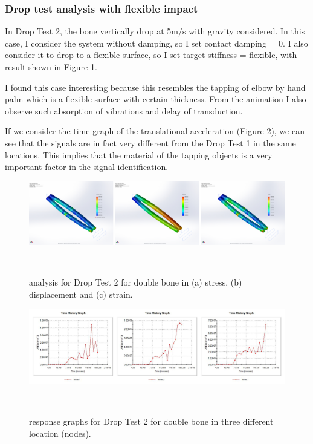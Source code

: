 \documentclass{sigchi}
\begin{document}
\subsubsection{Drop test analysis with flexible impact}

In Drop Test 2, the bone vertically drop at 5m/s with gravity considered. In this case, I consider the system without damping, so I set contact damping = 0. I also consider it to drop to a flexible surface, so I set target stiffness = flexible, with result shown in Figure \ref{fig:db_dt2_ana}. 

I found this case interesting because this resembles the tapping of elbow by hand palm which is a flexible surface with certain thickness. From the animation I also observe such absorption of vibrations and delay of transduction.

If we consider the time graph of the translational acceleration (Figure \ref{fig:db_dt2_res}), we can see that the signals are in fact very different from the Drop Test 1 in the same locations. This implies that the material of the tapping objects is a very important factor in the signal identification.

\begin{figure}
  \centering
  \includegraphics[width=1.95\columnwidth]{figures/db_dt2_ana}
  \caption{analysis for Drop Test 2 for double bone in (a) stress, (b) displacement and (c) strain.}
    ~\label{fig:db_dt2_ana}
\end{figure}

\begin{figure}
  \centering
  \includegraphics[width=1.95\columnwidth]{figures/db_dt2_res}
  \caption{response graphs for Drop Test 2 for double bone in three different location (nodes).}
    ~\label{fig:db_dt2_res}
\end{figure}
\end{document}

